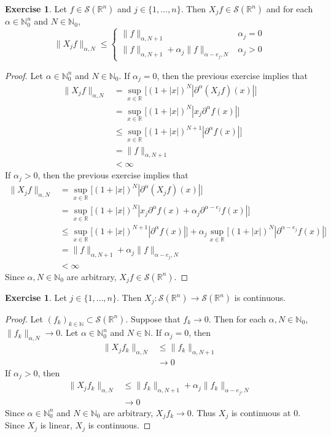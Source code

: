 \documentclass{book}
\theoremstyle{definition}
\newtheorem{ex}[definition]{Exercise}
\newcommand{\al}{\alpha}
\newcommand{\N}{\mathbb{N}}
\newcommand{\R}{\mathbb{R}}
\newcommand{\MS}{\mathcal{S}}
\DeclareMathOperator*{\0}{\mbf{0}}
\DeclareMathOperator*{\1}{\mbf{1}}
\newcommand{\p}{\partial}
\begin{document}
	\begin{ex}
		Let $f \in \MS(\R^n)$ and $j \in \{1, \ldots, n\}$. Then $X_jf \in \MS(\R^n)$ and for each $\al \in \N_0^n$ and $N \in \N_0$, 
		\[
		\|X_jf \|_{\al, N} \leq 
		\begin{cases}
			\|f\|_{\al, N+1} & \al_j = 0 \\
			\|f\|_{\al, N+1} + \al_j \|f\|_{\al - e_j, N} & \al_j > 0
		\end{cases}
		\] 
	\end{ex}
	
	\begin{proof}
		Let $\al  \in \N_0^n$ and $N \in \N_0$. If $\al_j = 0$, then the previous exercise implies that  
		\begin{align*}
			\|X_j f\|_{\al, N}
			& = \sup_{x \in \R}\bigg[ (1 + |x|)^N|\p^{\al}(X_jf)(x)| \bigg] \\
			& = \sup_{x \in \R}\bigg[ (1 + |x|)^N|x_j\p^{\al}f(x)| \bigg] \\
			& \leq \sup_{x \in \R}\bigg[ (1 + |x|)^{N+1}|\p^{\al}f(x)| \bigg] \\
			& = \|f\|_{\al, N+1} \\
			& < \infty 
		\end{align*}
		If $\al_j > 0$, then the previous exercise implies that  
		\begin{align*}
			\|X_j f\|_{\al, N}
			& = \sup_{x \in \R}\bigg[ (1 + |x|)^N|\p^{\al}(X_jf)(x)| \bigg] \\
			& = \sup_{x \in \R}\bigg[ (1 + |x|)^N|x_j\p^{\al}f(x) + \al_j \p^{\al - e_j} f(x)| \bigg] \\
			& \leq \sup_{x \in \R}\bigg[ (1 + |x|)^{N+1}|\p^{\al}f(x)| \bigg] + \al_j \sup_{x \in \R}\bigg[  (1 + |x|)^N |\p^{\al-e_j} f(x)| \bigg] \\
			& = \|f\|_{\al, N+1} + \al_j \|f\|_{\al-e_j, N} \\
			& < \infty
		\end{align*}
		Since $\al, N \in \N_0$ are arbitrary, $X_jf \in \MS(\R^n)$.
	\end{proof}

	\begin{ex}
		Let $j \in \{1, \ldots, n\}$. Then $X_j: \MS(\R^n) \rightarrow \MS(\R^n)$ is continuous.
	\end{ex}

	\begin{proof} 
		 Let $(f_k)_{k \in \N} \subset \MS(\R^n)$. Suppose that $f_k \rightarrow 0$. Then for each $\al, N \in \N_0$, $\|f_k\|_{\al, N} \rightarrow 0$. Let $\al \in \N_0^n$ and $N \in \N$. If $\al_j = 0$, then 
		\begin{align*}
			\|X_jf_k\|_{\al, N} 
			& \leq \|f_k\|_{\al, N+1} \\
			& \rightarrow 0
		\end{align*}
		If $\al_j > 0$, then 
		\begin{align*}
			\|X_jf_k\|_{\al, N} 
			& \leq \|f_k\|_{\al, N+1} + \al_j\|f_k\|_{\al - e_j, N}\\
			& \rightarrow 0
		\end{align*}
		Since $\al \in \N_0^n$ and $N \in \N_0$ are arbitrary, $X_jf_k \rightarrow 0$. Thus $X_j$ is continuous at $0$. Since $X_j$ is linear, $X_j$ is continuous.
	\end{proof}
\end{document}
